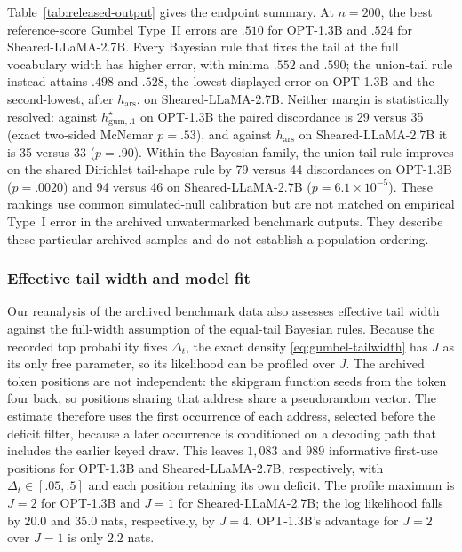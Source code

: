\documentclass[11pt]{article}
\begin{document}
Table~\ref{tab:released-output} gives the endpoint summary.  At $n=200$, the best reference-score Gumbel Type~II errors are $.510$ for OPT-1.3B and $.524$ for Sheared-LLaMA-2.7B.  Every Bayesian rule that fixes the tail at the full vocabulary width has higher error, with minima $.552$ and $.590$; the union-tail rule instead attains $.498$ and $.528$, the lowest displayed error on OPT-1.3B and the second-lowest, after $h_{\mathrm{ars}}$, on Sheared-LLaMA-2.7B.  Neither margin is statistically resolved: against $h^\star_{\mathrm{gum},.1}$ on OPT-1.3B the paired discordance is 29 versus 35 (exact two-sided McNemar $p=.53$), and against $h_{\mathrm{ars}}$ on Sheared-LLaMA-2.7B it is 35 versus 33 ($p=.90$).  Within the Bayesian family, the union-tail rule improves on the shared Dirichlet tail-shape rule by 79 versus 44 discordances on OPT-1.3B ($p=.0020$) and 94 versus 46 on Sheared-LLaMA-2.7B ($p=6.1\times10^{-5}$).  These rankings use common simulated-null calibration but are not matched on empirical Type~I error in the archived unwatermarked benchmark outputs.  They describe these particular archived samples and do not establish a population ordering.

\FloatBarrier
\subsubsection{Effective tail width and model fit}
\label{sec:released-width}

Our reanalysis of the archived benchmark data also assesses effective tail width against the full-width
assumption of the equal-tail Bayesian rules.  Because the recorded top probability
fixes $\Delta_t$, the exact density \eqref{eq:gumbel-tailwidth} has $J$ as its
only free parameter, so its likelihood can be profiled over $J$.  The archived token positions
are not independent: the skipgram function seeds from the token four back, so
positions sharing that address share a pseudorandom vector.  The estimate
therefore uses the first occurrence of each address, selected before the deficit
filter, because a later occurrence is conditioned on a decoding path that includes
the earlier keyed draw.
This leaves $1{,}083$ and $989$ informative first-use positions for OPT-1.3B and
Sheared-LLaMA-2.7B, respectively, with $\Delta_t\in[.05,.5]$ and each position
retaining its own deficit.  The profile maximum is $J=2$ for OPT-1.3B and $J=1$
for Sheared-LLaMA-2.7B; the log likelihood falls by $20.0$ and $35.0$ nats,
respectively, by $J=4$.  OPT-1.3B's advantage for $J=2$ over $J=1$ is only
$2.2$ nats.
\end{document}

